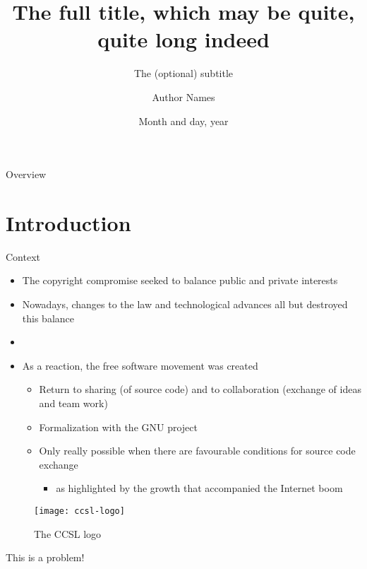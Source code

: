 \documentclass[
  xcolor={hyperref,svgnames,x11names,table},
  hyperref={pdfencoding=unicode,plainpages=false,pdfpagelabels=true,breaklinks=true},
  brazilian,english,12pt,aspectratio=149,
]{beamer}
\title[The shortened title]{The full title, which may be quite,\\
                            quite long indeed}
\subtitle{The (optional) subtitle}
\author[Shortened Author Names]{Author Names}
\institute{\textbf{Workshop Name}\\Computer Science Department\\IME USP}
\date{Month and day, year}
\begin{document}
\maketitle

\showqrcode

\begin{frame}[t]{Overview}
  \overview
\end{frame}

\section{Introduction}

\begin{frame}{Context}
  \begin{itemize}
    \item The copyright compromise seeked to balance public and private interests
    \item Nowadays, changes to the law and technological advances all but destroyed this balance
    \item[]\strut %
    \item As a reaction, the free software movement was created
    \begin{itemize}
      \item Return to sharing (of source code) and to collaboration (exchange of ideas and team work)
      \item Formalization with the GNU project
      \item Only really possible when there are favourable conditions for source code exchange
      \begin{itemize}
        \item as highlighted by the growth that accompanied the Internet boom
      \end{itemize}
    \end{itemize}
  \end{itemize}

\end{frame}

\begin{frame}[plain]
  \begin{figure}[H] %
    \texttt{[image: ccsl-logo]}
    \caption{The CCSL logo}
  \end{figure}
\end{frame}

\begin{frame}[standout]
  This is a problem!
\end{frame}
\end{document}
